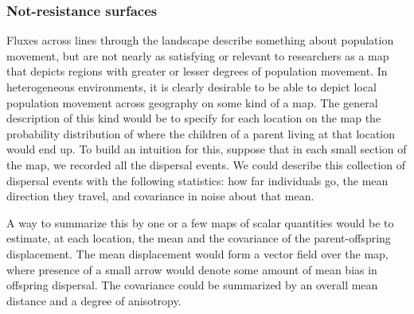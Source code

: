\documentclass{ar-1col}
\newcommand{\plr}[1]{{\color{green}{#1}}}
\newcommand{\todo}[1]{{\textbf{\color{red}{#1}}}}
\newcommand{\E}{\mathbb{E}}
\begin{document}

\todo{tidy and conclude}

\subsubsection{Not-resistance surfaces}

Fluxes across lines through the landscape
describe something about population movement,
but are not nearly as satisfying or relevant to researchers
as a map that depicts regions with greater or lesser degrees of population movement.
In heterogeneous environments,
it is clearly desirable to be able to depict local population movement across geography on some kind of a map.
The general description of this kind would be to specify for each location on the map
the probability distribution of where the children of a parent living at that location would end up.
To build an intuition for this,
suppose that in each small section of the map,
we recorded all the dispersal events.
We could describe this collection of dispersal events 
with the following statistics:
how far individuals go,
the mean direction they travel,
and covariance in noise about that mean.

A way to summarize this by one or a few maps of scalar quantities would be to estimate, 
at each location, the mean and the covariance of the parent-offspring displacement.
The mean displacement would form a vector field over the map,
where presence of a small arrow would denote some amount of mean bias in offspring dispersal.
The covariance could be summarized by an overall mean distance and a degree of anisotropy.
\end{document}

